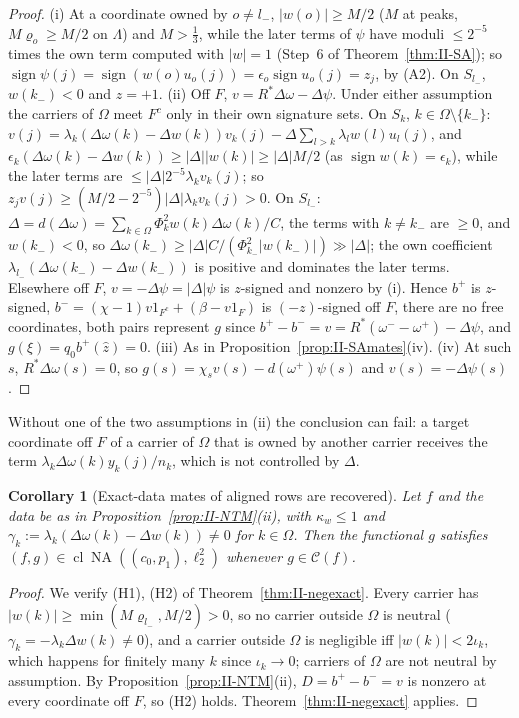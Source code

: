 \documentclass[10pt]{amsart}
\newtheorem{corollary}[theorem]{Corollary}
\theoremstyle{definition}
\theoremstyle{remark}
\newcommand{\NA}{\operatorname{NA}}
\newcommand{\sgn}{\operatorname{sign}}
\newcommand{\Cset}{\mathcal C}
\newcommand{\cl}{\operatorname{cl}}
\newcommand{\zh}{\hat z}
\begin{document}
\begin{proof}
(i) At a coordinate owned by $o\ne l_-$, $|w(o)|\ge M/2$ ($M$ at peaks, $M\varrho_o\ge M/2$
on $\Lambda$) and $M>\frac13$, while the later terms of $\psi$ have moduli $\le2^{-5}$ times
the own term computed with $|w|=1$ (Step~6 of Theorem~\ref{thm:II-SA}); so $\sgn\psi(j)=
\sgn(w(o)u_o(j))=\epsilon_o\sgn u_o(j)=z_j$, by (A2).  On $S_{l_-}$, $w(k_-)<0$ and $z=+1$.
(ii) Off $F$, $v=R^*\Delta\omega-\Delta\psi$.  Under either assumption the carriers of $\Omega$
meet $F^c$ only in their own signature sets.  On $S_k$, $k\in\Omega\setminus\{k_-\}$:
$v(j)=\lambda_k(\Delta\omega(k)-\Delta w(k))v_k(j)-\Delta\sum_{l>k}\lambda_lw(l)u_l(j)$, and
$\epsilon_k(\Delta\omega(k)-\Delta w(k))\ge|\Delta||w(k)|\ge|\Delta|M/2$ (as $\sgn w(k)=\epsilon_k$), while the later
terms are $\le|\Delta|2^{-5}\lambda_kv_k(j)$; so $z_jv(j)\ge(M/2-2^{-5})|\Delta|\lambda_kv_k(j)>0$.  On
$S_{l_-}$: $\Delta=d(\Delta\omega)=\sum_{k\in\Omega}\Phi_k^2w(k)\Delta\omega(k)/C$, the terms with $k\ne k_-$
are $\ge0$, and $w(k_-)<0$, so $\Delta\omega(k_-)\ge|\Delta|C/(\Phi_{k_-}^2|w(k_-)|)\gg|\Delta|$; the own
coefficient $\lambda_{l_-}(\Delta\omega(k_-)-\Delta w(k_-))$ is positive and dominates the later terms.  Elsewhere off $F$, $v=-\Delta\psi=|\Delta|\psi$ is $z$-signed and nonzero by (i).
Hence $b^+$ is $z$-signed, $b^-=(\chi-1)v1_{F^c}+(\beta-v1_F)$ is $(-z)$-signed off $F$, there
are no free coordinates, both pairs represent $g$ since $b^+-b^-=v=R^*(\omega^--\omega^+)-
\Delta\psi$, and $g(\xi)=q_0b^+(\zh)=0$.  (iii) As in Proposition~\ref{prop:II-SAmates}(iv).
(iv) At such $s$, $R^*\Delta\omega(s)=0$, so $g(s)=\chi_sv(s)-d(\omega^+)\psi(s)$ and $v(s)=-\Delta\psi(s)$.
\end{proof}

Without one of the two assumptions in (ii) the conclusion can fail: a target
coordinate off $F$ of a carrier of $\Omega$ that is owned by another carrier receives
the term $\lambda_k\Delta\omega(k)y_k(j)/n_k$, which is not controlled by $\Delta$.

\begin{corollary}[Exact-data mates of aligned rows are recovered]\label{cor:II-NTR}
Let $f$ and the data be as in Proposition~\textup{\ref{prop:II-NTM}(ii)}, with
$\kappa_w\le1$ and $\gamma_k:=\lambda_k(\Delta\omega(k)-\Delta w(k))\ne0$ for $k\in\Omega$.  Then the
functional $g$ satisfies $(f,g)\in\cl\NA((c_0,p_1),\ell_2^2)$ whenever $g\in\Cset(f)$.
\end{corollary}

\begin{proof}
We verify (H1), (H2) of Theorem~\ref{thm:II-negexact}.  Every carrier has $|w(k)|\ge
\min(M\varrho_{l_-},M/2)>0$, so no carrier outside $\Omega$ is neutral ($\gamma_k=-\lambda_k\Delta w(k)\ne
0$), and a carrier outside $\Omega$ is negligible iff $|w(k)|<2\iota_k$, which happens for
finitely many $k$ since $\iota_k\to0$; carriers of $\Omega$ are not neutral by assumption.
By Proposition~\ref{prop:II-NTM}(ii), $D=b^+-b^-=v$ is nonzero at every coordinate off
$F$, so (H2) holds.  Theorem~\ref{thm:II-negexact} applies.
\end{proof}
\end{document}
